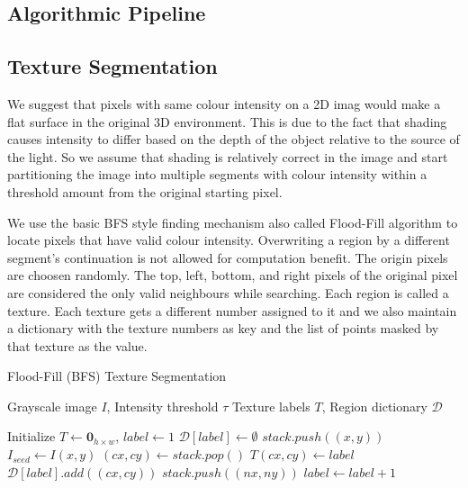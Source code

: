 \documentclass[12pt]{article}
\begin{document}
\begin{multicols}{2}
\section{Algorithmic Pipeline}

\subsection{Texture Segmentation}

We suggest that pixels with same colour intensity on a 2D imag would make a flat surface in the original 3D environment. This is due to the fact that shading causes intensity to 
differ based on the depth of the object relative to the source of the light. So we assume that shading is relatively correct in the image and start partitioning the image into 
multiple segments with colour intensity within a threshold amount from the original starting pixel. 

We use the basic BFS style finding mechanism also called Flood-Fill algorithm to locate pixels that have valid colour intensity. Overwriting a region by a different segment's 
continuation is not allowed for computation benefit. The origin pixels are choosen randomly. The top, left, bottom, and right pixels of the original pixel are considered 
the only valid neighbours while searching. Each region is called a texture. Each texture gets a different number assigned to it and we also maintain a dictionary with the texture numbers
as key and the list of points masked by that texture as the value.

\begin{algorithm}[H]
\caption{Flood-Fill (BFS) Texture Segmentation}
\begin{algorithmic}[1]
\Require{} Grayscale image $I$, Intensity threshold $\tau$
\Ensure{}{} Texture labels $T$, Region dictionary $\mathcal{D}$

\State{}{} Initialize $T \gets \mathbf{0}_{h\times w}$, $label \gets 1$
        \State{} $\mathcal{D}[label] \gets \emptyset$
        \State{} $stack.push((x,y))$
        \State{} $I_{seed} \gets I(x,y)$
            \State{} $(cx,cy) \gets stack.pop()$
                \State{} $T(cx,cy) \gets label$
                \State{} $\mathcal{D}[label].add((cx,cy))$
                        \State{} $stack.push((nx,ny))$
                    \EndIf{}
                \EndFor{}
            \EndIf{}
        \EndWhile{}
        \State{} $label \gets label + 1$
    \EndIf{}
\EndFor{}
\end{algorithmic}
\end{algorithm}



\end{multicols}
\end{document}
